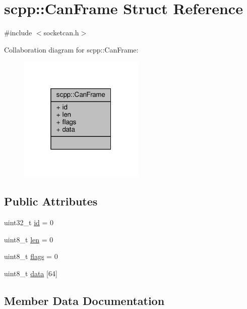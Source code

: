 \hypertarget{structscpp_1_1CanFrame}{}\section{scpp\+:\+:Can\+Frame Struct Reference}
\label{structscpp_1_1CanFrame}


{\ttfamily \#include $<$socketcan.\+h$>$}



Collaboration diagram for scpp\+:\+:Can\+Frame\+:
\nopagebreak
\begin{figure}[H]
\begin{center}
\leavevmode
\includegraphics[width=169pt]{structscpp_1_1CanFrame__coll__graph}
\end{center}
\end{figure}
\subsection*{Public Attributes}
\begin{DoxyCompactItemize}
\item 
uint32\+\_\+t \hyperlink{structscpp_1_1CanFrame_a926c47e6fa4f8a2809b31ac85cc89b15}{id} = 0
\item 
uint8\+\_\+t \hyperlink{structscpp_1_1CanFrame_ab949305fcfb1820ea8ca338bfad7fe6a}{len} = 0
\item 
uint8\+\_\+t \hyperlink{structscpp_1_1CanFrame_a4b548ba3048832804bca2c05d6ee4787}{flags} = 0
\item 
uint8\+\_\+t \hyperlink{structscpp_1_1CanFrame_a61f2cb4a342280cd8710c22c3d672db5}{data} \mbox{[}64\mbox{]}
\end{DoxyCompactItemize}


\subsection{Member Data Documentation}
\mbox{\label{structscpp_1_1CanFrame_a61f2cb4a342280cd8710c22c3d672db5}} 
